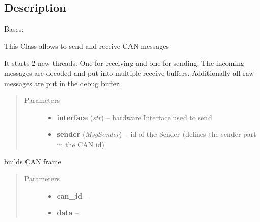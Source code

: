 \documentclass[letterpaper,10pt,english]{sphinxmanual}
\begin{document}
\subsection{Description}
\label{libraries:module-libraries.can}\label{libraries:description}

\begin{fulllineitems}
\label{libraries:libraries.can.Can}
Bases: 

This Class allows to send and receive CAN messages

It starts 2 new threads. One for receiving and one for sending.
The incoming messages are decoded and put into multiple receive buffers.
Additionally all raw messages are put in the debug buffer.
\begin{quote}\begin{description}
\item[{Parameters}] \leavevmode\begin{itemize}
\item {} 
\textbf{interface} (\emph{str}) -- hardware Interface used to send

\item {} 
\textbf{sender} (\emph{MsgSender}) -- id of the Sender (defines the sender part in the CAN id)

\end{itemize}

\end{description}\end{quote}

\begin{fulllineitems}
\label{libraries:libraries.can.Can._build_can_frame}
builds CAN frame
\begin{quote}\begin{description}
\item[{Parameters}] \leavevmode\begin{itemize}
\item {} 
\textbf{can\_id} -- 

\item {} 
\textbf{data} -- 

\end{itemize}


\end{description}
\end{quote}
\end{fulllineitems}
\end{fulllineitems}
\end{document}
